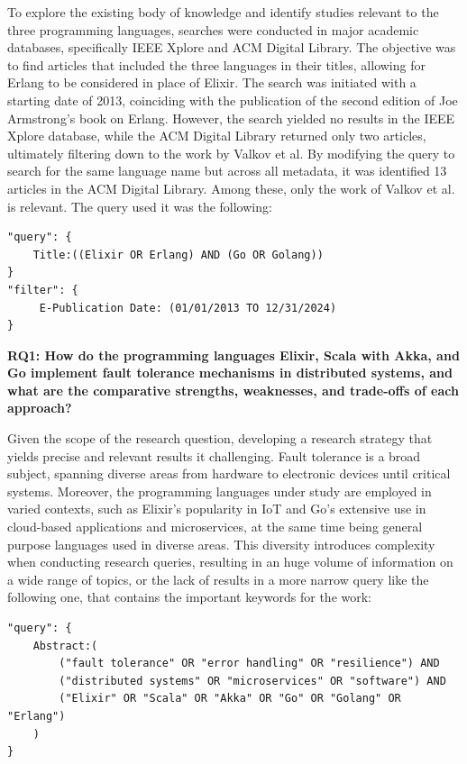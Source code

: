 To explore the existing body of knowledge and identify studies relevant to the three programming languages, searches were conducted in major academic databases, specifically IEEE Xplore and ACM Digital Library. The objective was to find articles that included the three languages in their titles, allowing for Erlang to be considered in place of Elixir. The search was initiated with a starting date of 2013, coinciding with the publication of the second edition of Joe Armstrong's book on Erlang. However, the search yielded no results in the IEEE Xplore database, while the ACM Digital Library returned only two articles, ultimately filtering down to the work by Valkov et al. By modifying the query to search for the same language name but across all metadata, it was identified 13 articles in the ACM Digital Library. Among these, only the work of Valkov et al. \cite{Valkov2018} is relevant. The query used it was the following:

\begin{verbatim}
"query": { 
    Title:((Elixir OR Erlang) AND (Go OR Golang)) 
}
"filter": {
     E-Publication Date: (01/01/2013 TO 12/31/2024)
}
\end{verbatim}

\textbf{RQ1: How do the programming languages Elixir, Scala with Akka, and Go implement fault tolerance mechanisms in distributed systems, and what are the comparative
    strengths, weaknesses, and trade-offs of each approach?}

Given the scope of the research question, developing a research strategy that yields precise and relevant results it challenging. Fault tolerance is a broad subject, spanning diverse areas from hardware to electronic devices until critical systems. Moreover, the programming languages under study are employed in varied contexts, such as Elixir’s popularity in \gls{IoT} and Go’s extensive use in cloud-based applications and microservices, at the same time being general purpose languages used in diverse areas. This diversity introduces complexity when conducting research queries, resulting in an huge volume of information on a wide range of topics, or the lack of results in a more narrow query like the following one, that contains the important keywords for the work:

\begin{verbatim}
"query": { 
    Abstract:(
        ("fault tolerance" OR "error handling" OR "resilience") AND
        ("distributed systems" OR "microservices" OR "software") AND 
        ("Elixir" OR "Scala" OR "Akka" OR "Go" OR "Golang" OR "Erlang")
    )
}
\end{verbatim}


